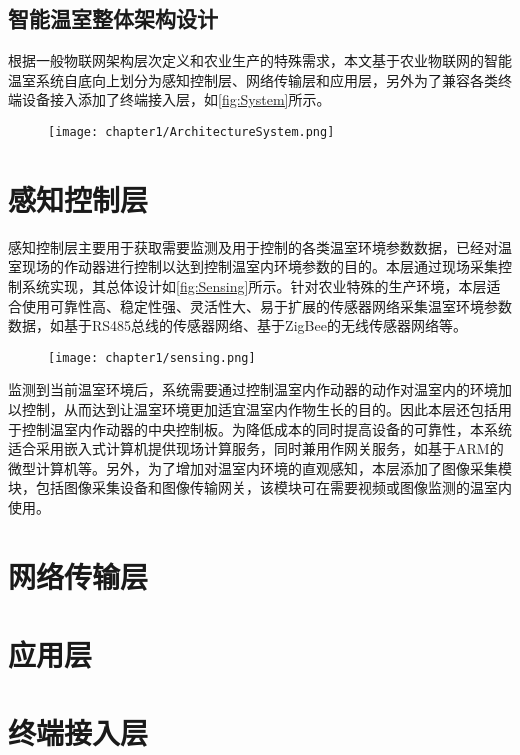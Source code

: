	\subsection{智能温室整体架构设计}
	根据一般物联网架构层次定义和农业生产的特殊需求，本文基于农业物联网的智能温室系统自底向上划分为感知控制层、网络传输层和应用层，另外为了兼容各类终端设备接入添加了终端接入层\supercite{WangHuaiyu2015}，如\ref{fig:System}所示。
		\begin{figure}[!htp]
  			\centering
 			\texttt{[image: chapter1/ArchitectureSystem.png]}
		\end{figure}
		
\section{感知控制层}
感知控制层主要用于获取需要监测及用于控制的各类温室环境参数数据，已经对温室现场的作动器进行控制以达到控制温室内环境参数的目的。本层通过现场采集控制系统实现，其总体设计如\ref{fig:Sensing}所示。针对农业特殊的生产环境，本层适合使用可靠性高、稳定性强、灵活性大、易于扩展的传感器网络采集温室环境参数数据，如基于RS485总线的传感器网络、基于ZigBee的无线传感器网络等。
		\begin{figure}[!htp]
  			\centering
 			\texttt{[image: chapter1/sensing.png]}
		\end{figure}

监测到当前温室环境后，系统需要通过控制温室内作动器的动作对温室内的环境加以控制，从而达到让温室环境更加适宜温室内作物生长的目的。因此本层还包括用于控制温室内作动器的中央控制板。为降低成本的同时提高设备的可靠性，本系统适合采用嵌入式计算机提供现场计算服务，同时兼用作网关服务，如基于ARM的微型计算机等。另外，为了增加对温室内环境的直观感知，本层添加了图像采集模块，包括图像采集设备和图像传输网关，该模块可在需要视频或图像监测的温室内使用。
\section{网络传输层}

\section{应用层}

\section{终端接入层}
 
